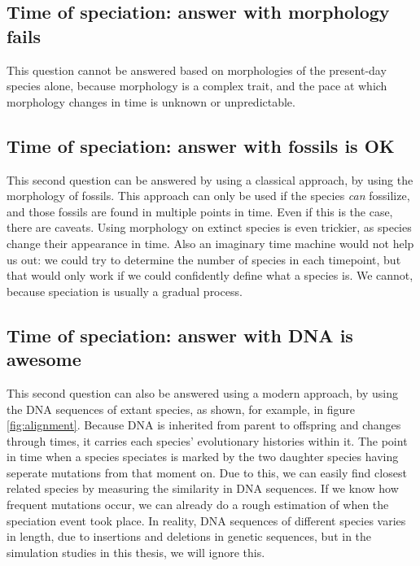 \subsection{Time of speciation: answer with morphology fails}

This question cannot be answered based on morphologies of the present-day
species alone, because morphology is a complex trait, and the pace at
which morphology changes in time is unknown or unpredictable.

\subsection{Time of speciation: answer with fossils is OK}

This second question can be answered by
using a classical approach, 
by using the morphology of fossils.
This approach can only be used if the species \emph{can} fossilize,
and those fossils are found in multiple points in time.
Even if this is the case, there are caveats. Using morphology on
extinct species is even trickier, as species change their appearance in time.
Also an imaginary time machine would not help us out:
we could try to determine the number of species in each timepoint,
but that would only work if we could confidently define what a
species is. We cannot, because speciation is usually a gradual process.

\subsection{Time of speciation: answer with DNA is awesome}

This second question can also be answered 
using a modern approach, 
by using the DNA sequences of extant species,
as shown, for example, in figure \ref{fig:alignment}.
Because DNA is inherited from parent to offspring
and changes through times, it carries each species' 
evolutionary histories within it.
The point in time when a species speciates is
marked by the two daughter species having seperate mutations
from that moment on.
Due to this, we can easily find closest related species 
by measuring the similarity in DNA sequences.
If we know how frequent mutations occur, we can already
do a rough estimation of when the speciation event took place.
In reality, DNA sequences of different species 
varies in length, due to insertions and deletions in genetic sequences,
but in the simulation studies in this thesis, we will ignore this.

